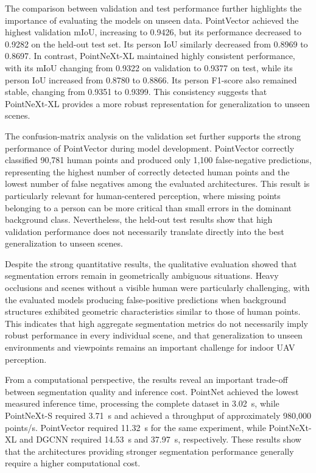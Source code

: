 The comparison between validation and test performance further highlights the importance of evaluating the models on unseen data. PointVector achieved the highest validation mIoU, increasing to 0.9426, but its performance decreased to 0.9282 on the held-out test set. Its person IoU similarly decreased from 0.8969 to 0.8697. In contrast, PointNeXt-XL maintained highly consistent performance, with its mIoU changing from 0.9322 on validation to 0.9377 on test, while its person IoU increased from 0.8780 to 0.8866. Its person F1-score also remained stable, changing from 0.9351 to 0.9399. This consistency suggests that PointNeXt-XL provides a more robust representation for generalization to unseen scenes.

The confusion-matrix analysis on the validation set further supports the strong performance of PointVector during model development. PointVector correctly classified 90,781 human points and produced only 1,100 false-negative predictions, representing the highest number of correctly detected human points and the lowest number of false negatives among the evaluated architectures. This result is particularly relevant for human-centered perception, where missing points belonging to a person can be more critical than small errors in the dominant background class. Nevertheless, the held-out test results show that high validation performance does not necessarily translate directly into the best generalization to unseen scenes.

Despite the strong quantitative results, the qualitative evaluation showed that segmentation errors remain in geometrically ambiguous situations. Heavy occlusions and scenes without a visible human were particularly challenging, with the evaluated models producing false-positive predictions when background structures exhibited geometric characteristics similar to those of human points. This indicates that high aggregate segmentation metrics do not necessarily imply robust performance in every individual scene, and that generalization to unseen environments and viewpoints remains an important challenge for indoor UAV perception.

From a computational perspective, the results reveal an important trade-off between segmentation quality and inference cost. PointNet achieved the lowest measured inference time, processing the complete dataset in 3.02~s, while PointNeXt-S required 3.71~s and achieved a throughput of approximately 980,000 points/s. PointVector required 11.32~s for the same experiment, while PointNeXt-XL and DGCNN required 14.53~s and 37.97~s, respectively. These results show that the architectures providing stronger segmentation performance generally require a higher computational cost.

